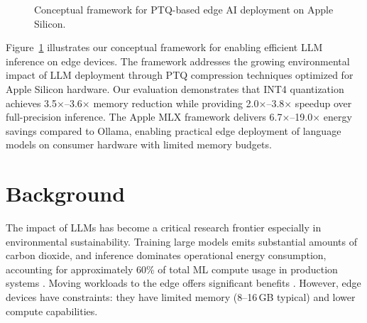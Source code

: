 \documentclass[conference]{IEEEtran}
\begin{document}
\begin{figure}[t]
\caption{Conceptual framework for PTQ-based edge AI deployment on Apple Silicon.}
\label{fig:framework}
\end{figure}

Figure~\ref{fig:framework} illustrates our conceptual framework for enabling efficient LLM inference on edge devices. The framework addresses the growing environmental impact of LLM deployment through PTQ compression techniques optimized for Apple Silicon hardware. Our evaluation demonstrates that INT4 quantization achieves 3.5$\times$--3.6$\times$ memory reduction while providing 2.0$\times$--3.8$\times$ speedup over full-precision inference. The Apple MLX framework delivers 6.7$\times$--19.0$\times$ energy savings compared to Ollama, enabling practical edge deployment of language models on consumer hardware with limited memory budgets.

\section{Background}

The impact of LLMs has become a critical research frontier especially in environmental sustainability. Training large models emits substantial amounts of carbon dioxide, and inference dominates operational energy consumption, accounting for approximately 60\% of total ML compute usage in production systems \cite{patterson2021carbon}. Moving workloads to the edge offers significant benefits \cite{shi2016edge}. However, edge devices have constraints: they have limited memory (8--16\,GB typical) and lower compute capabilities.
\end{document}
